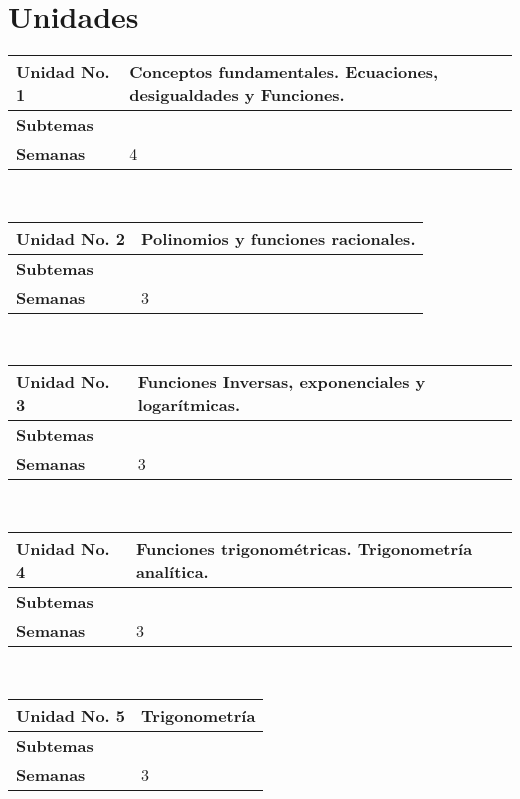 \documentclass[11pt]{article}
\begin{document}
\section*{Unidades}
\noindent 
\begin{tabular}{R{0.16\textwidth} L{0.7\textwidth}} 
 \\ 
\toprule \textbf{Unidad No. 1} & Conceptos fundamentales. Ecuaciones, desigualdades y  Funciones. 
 \\ 
\midrule\textbf{Subtemas} & 
\begin{description}
 
\end{description}
 \\ 
\textbf{Semanas} & 4 
\end{tabular} 
 \\ 
 \begin{tabular}{R{0.16\textwidth} L{0.7\textwidth}} 
 \\ 
\toprule \textbf{Unidad No. 2} & Polinomios y funciones racionales. 
 \\ 
\midrule\textbf{Subtemas} & 
\begin{description}
 
\end{description}
 \\ 
\textbf{Semanas} & 3 
\end{tabular} 
 \\ 
 \begin{tabular}{R{0.16\textwidth} L{0.7\textwidth}} 
 \\ 
\toprule \textbf{Unidad No. 3} & Funciones Inversas, exponenciales y logarítmicas. 
 \\ 
\midrule\textbf{Subtemas} & 
\begin{description}
 
\end{description}
 \\ 
\textbf{Semanas} & 3 
\end{tabular} 
 \\ 
 \begin{tabular}{R{0.16\textwidth} L{0.7\textwidth}} 
 \\ 
\toprule \textbf{Unidad No. 4} & Funciones trigonométricas. Trigonometría analítica. 
 \\ 
\midrule\textbf{Subtemas} & 
\begin{description}
 
\end{description}
 \\ 
\textbf{Semanas} & 3 
\end{tabular} 
 \\ 
 \begin{tabular}{R{0.16\textwidth} L{0.7\textwidth}} 
 \\ 
\toprule \textbf{Unidad No. 5} & Trigonometría 
 \\ 
\midrule\textbf{Subtemas} & 
\begin{description}
 
\end{description}
 \\ 
\textbf{Semanas} & 3 
\end{tabular} 
 \\ 
 
\end{document}
